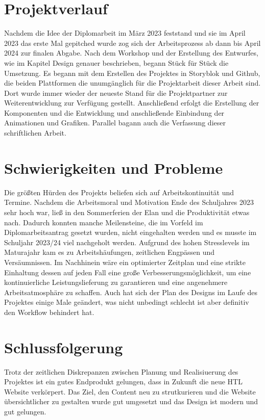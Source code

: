 \section{Projektverlauf}

Nachdem die Idee der Diplomarbeit im März 2023 feststand und sie im April 2023 das erste Mal gepitched wurde zog sich der Arbeitsprozess 
ab dann bis April 2024 zur finalen Abgabe. 
Nach dem Workshop und der Erstellung des Entwurfes, wie im Kapitel Design genauer beschrieben, begann Stück für Stück die Umsetzung.
Es begann mit dem Erstellen des Projektes in Storyblok und Github, die beiden Plattformen die unumgänglich für die Projektarbeit dieser Arbeit sind.
Dort wurde immer wieder der neueste Stand für die Projektpartner zur Weiterentwicklung zur Verfügung gestellt.  
Anschließend erfolgt die Erstellung der Komponenten und die Entwicklung und anschließende Einbindung der Animationen und Grafiken. Parallel
bagann auch die Verfassung dieser schriftlichen Arbeit.

\section{Schwierigkeiten und Probleme}

Die größten Hürden des Projekts beliefen sich auf Arbeitskontinuität und Termine. Nachdem die Arbeitsmoral und Motivation Ende des Schuljahres 2023
sehr hoch war, ließ in den Sommerferien der Elan und die Produktivität etwas nach. Dadurch konnten manche Meilensteine, die im Vorfeld im Diplomarbeitsantrag
gesetzt wurden, nicht eingehalten werden und es musste im Schuljahr 2023/24 viel nachgeholt werden. Aufgrund des hohen Stresslevels im Maturajahr
kam es zu Arbeitshäufungen, zeitlichen Engpässen und Versäumnissen. Im Nachhinein wäre ein optimierter Zeitplan und eine strikte Einhaltung dessen auf jeden Fall
eine große Verbesserungsmöglichkeit, um eine kontinuierliche Leistungslieferung zu garantieren und eine angenehmere Arbeitsatmosphäre zu schaffen.
Auch hat sich der Plan des Designs im Laufe des Projektes einige Male geändert, was nicht unbedingt schlecht ist aber definitiv den 
Workflow behindert hat.


\section{Schlussfolgerung}

Trotz der zeitlichen Diskrepanzen zwischen Planung und Realisiuerung des Projektes ist ein gutes Endprodukt gelungen, dass in Zukunft die neue 
HTL Website verkörpert. Das Ziel, den Content neu zu strutkurieren und die Website übersichtlicher zu gestalten wurde gut umgesetzt und das Design ist
modern und gut gelungen.